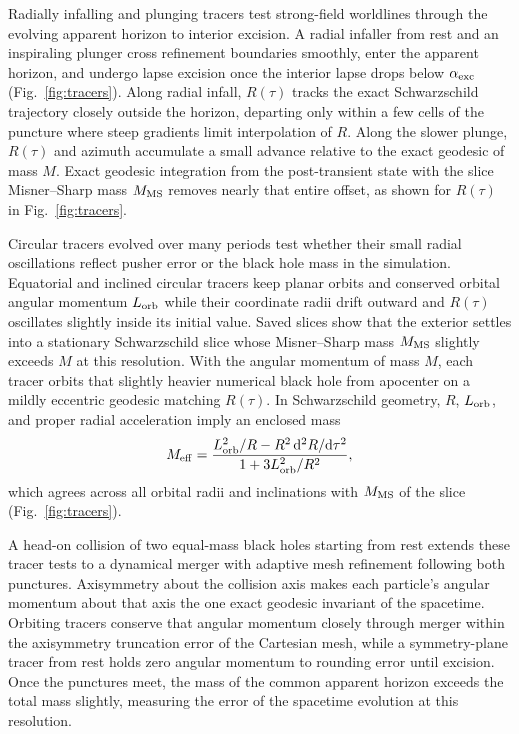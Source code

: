 Radially infalling and plunging tracers test strong-field worldlines through the evolving apparent horizon to interior excision. A radial infaller from rest and an inspiraling plunger cross refinement boundaries smoothly, enter the apparent horizon, and undergo lapse excision once the interior lapse drops below $\alpha_{\rm exc}$ (Fig.~\ref{fig:tracers}). Along radial infall, $R(\tau)$ tracks the exact Schwarzschild trajectory closely outside the horizon, departing only within a few cells of the puncture where steep gradients limit interpolation of $R$. Along the slower plunge, $R(\tau)$ and azimuth accumulate a small advance relative to the exact geodesic of mass $M$. Exact geodesic integration from the post-transient state with the slice Misner--Sharp mass $M_{\rm MS}$ removes nearly that entire offset, as shown for $R(\tau)$ in Fig.~\ref{fig:tracers}.

Circular tracers evolved over many periods test whether their small radial oscillations reflect pusher error or the black hole mass in the simulation. Equatorial and inclined circular tracers keep planar orbits and conserved orbital angular momentum $L_{\rm orb}$ while their coordinate radii drift outward and $R(\tau)$ oscillates slightly inside its initial value. Saved slices show that the exterior settles into a stationary Schwarzschild slice whose Misner--Sharp mass $M_{\rm MS}$ slightly exceeds $M$ at this resolution. With the angular momentum of mass $M$, each tracer orbits that slightly heavier numerical black hole from apocenter on a mildly eccentric geodesic matching $R(\tau)$. In Schwarzschild geometry, $R$, $L_{\rm orb}$, and proper radial acceleration imply an enclosed mass
\begin{equation}\label{eq:implied_mass}
M_{\rm eff} = \frac{L_{\rm orb}^2/R - R^2\,\mathrm{d}^2 R/\mathrm{d}\tau^2}{1 + 3L_{\rm orb}^2/R^2},
\end{equation}
which agrees across all orbital radii and inclinations with $M_{\rm MS}$ of the slice (Fig.~\ref{fig:tracers}).

A head-on collision of two equal-mass black holes starting from rest extends these tracer tests to a dynamical merger with adaptive mesh refinement following both punctures. Axisymmetry about the collision axis makes each particle's angular momentum about that axis the one exact geodesic invariant of the spacetime. Orbiting tracers conserve that angular momentum closely through merger within the axisymmetry truncation error of the Cartesian mesh, while a symmetry-plane tracer from rest holds zero angular momentum to rounding error until excision. Once the punctures meet, the mass of the common apparent horizon exceeds the total mass slightly, measuring the error of the spacetime evolution at this resolution.

